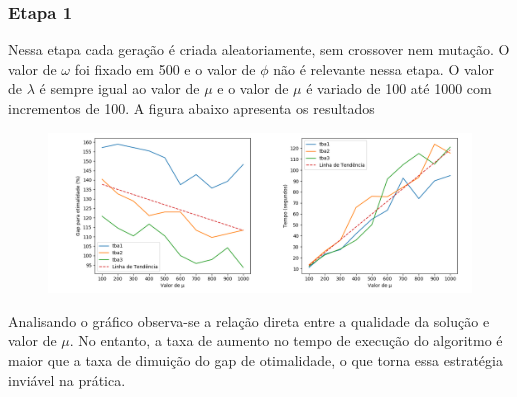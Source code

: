 \documentclass{article}
\begin{document}
\subsubsection{Etapa 1}
Nessa etapa cada geração é criada aleatoriamente, sem crossover nem mutação. O valor de $\omega$ foi fixado em 500 e o valor de $\phi$ não é relevante nessa etapa. O valor de $\lambda$ é sempre igual ao valor de $\mu$ e o valor de $\mu$ é variado de 100 até 1000 com incrementos de 100. A figura abaixo apresenta os resultados
\begin{figure}[H]
\centering
\includegraphics[scale=0.40]{random}
\end{figure}
Analisando o gráfico observa-se a relação direta entre a qualidade da solução e valor de $\mu$. No entanto, a taxa de aumento no tempo de execução do algoritmo é maior que a taxa de dimuição do gap de otimalidade, o que torna essa estratégia inviável na prática.
\end{document}
